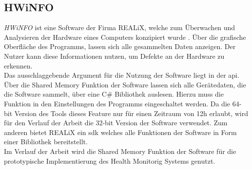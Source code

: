 \subsection{HWiNFO}\label{sec:HWiNFO}
\textit{HWiNFO} ist eine Software der Firma REALiX, welche zum Überwachen und Analysieren der Hardware eines Computers konzipiert wurde \cite{HWINFO}. Über die grafische Oberfläche des Programms, lassen sich alle gesammelten Daten anzeigen. Der Nutzer kann diese Informationen nutzen, um Defekte an der Hardware zu erkennen.\\
Das ausschlaggebende Argument für die Nutzung der Software liegt in der \ac{api}. Über die Shared Memory Funktion der Software lassen sich alle Gerätedaten, die die Software sammelt, über eine C\# Bibliothek auslesen. Hierzu muss die Funktion in den Einstellungen des Programms eingeschaltet werden. Da die 64-bit Version des Tools dieses Feature nur für einen Zeitraum von 12h erlaubt, wird für den Verlauf der Arbeit die 32-bit Version der Software verwendet. Zum anderen bietet REALiX ein \ac{sdk} welches alle Funktionen der Software in Form einer Bibliothek bereitstellt.\cite{HWINFO}\\
Im Verlauf der Arbeit wird die Shared Memory Funktion der Software für die prototypische Implementierung des Health Monitorig Systems genutzt.   